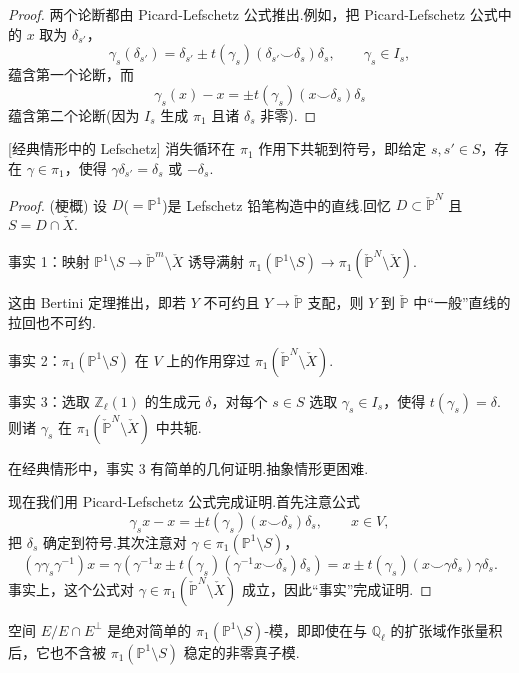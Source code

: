 \begin{proof}
两个论断都由 Picard-Lefschetz 公式推出.例如，把 Picard-Lefschetz 公式中的 $x$ 取为 $\delta_{s'}$，
\[
\gamma_s(\delta_{s'}) = \delta_{s'} \pm t(\gamma_s)(\delta_{s'} \smile \delta_s)\delta_s, \qquad \gamma_s \in I_s,
\]
蕴含第一个论断，而
\[
\gamma_s(x) - x = \pm t(\gamma_s)(x \smile \delta_s)\delta_s
\]
蕴含第二个论断(因为 $I_s$ 生成 $\pi_1$ 且诸 $\delta_s$ 非零).
\end{proof}

\begin{theorem}\label{thm:32.3}[经典情形中的 Lefschetz]
消失循环在 $\pi_1$ 作用下共轭到符号，即给定 $s, s' \in S$，存在 $\gamma \in \pi_1$，使得 $\gamma\delta_{s'} = \delta_s$ 或 $-\delta_s$.
\end{theorem}

\begin{proof}
(梗概) 设 $D$($= \mathbb{P}^{1}$)是 Lefschetz 铅笔构造中的直线.回忆 $D \subset \check{\mathbb{P}}^{N}$ 且 $S = D \cap \check{X}$.

事实 1：映射 $\mathbb{P}^{1} \setminus S \to \check{\mathbb{P}}^{m} \setminus \check{X}$ 诱导满射 $\pi_1(\mathbb{P}^{1} \setminus S) \to \pi_1(\check{\mathbb{P}}^{N} \setminus \check{X})$.

这由 Bertini 定理推出，即若 $Y$ 不可约且 $Y \to \check{\mathbb{P}}$ 支配，则 $Y$ 到 $\check{\mathbb{P}}$ 中``一般''直线的拉回也不可约.

事实 2：$\pi_1(\mathbb{P}^{1} \setminus S)$ 在 $V$ 上的作用穿过 $\pi_1(\check{\mathbb{P}}^{N} \setminus \check{X})$.

事实 3：选取 $\mathbb{Z}_{\ell}(1)$ 的生成元 $\delta$，对每个 $s \in S$ 选取 $\gamma_s \in I_s$，使得 $t(\gamma_s) = \delta$.则诸 $\gamma_s$ 在 $\pi_1(\check{\mathbb{P}}^{N} \setminus \check{X})$ 中共轭.

在经典情形中，事实 3 有简单的几何证明.抽象情形更困难.

现在我们用 Picard-Lefschetz 公式完成证明.首先注意公式
\[
\gamma_s x - x = \pm t(\gamma_s)(x \smile \delta_s)\delta_s, \qquad x \in V,
\]
把 $\delta_s$ 确定到符号.其次注意对 $\gamma \in \pi_1(\mathbb{P}^{1} \setminus S)$，
\[
(\gamma\gamma_s\gamma^{-1})x = \gamma(\gamma^{-1}x \pm t(\gamma_s)(\gamma^{-1}x \smile \delta_s)\delta_s) = x \pm t(\gamma_s)(x \smile \gamma\delta_s)\gamma\delta_s.
\]
事实上，这个公式对 $\gamma \in \pi_1(\check{\mathbb{P}}^{N} \setminus \check{X})$ 成立，因此``事实''完成证明.
\end{proof}

\begin{corollary}\label{cor:32.4}
空间 $E/E \cap E^{\perp}$ 是绝对简单的 $\pi_1(\mathbb{P}^{1} \setminus S)$-模，即即使在与 $\mathbb{Q}_{\ell}$ 的扩张域作张量积后，它也不含被 $\pi_1(\mathbb{P}^{1} \setminus S)$ 稳定的非零真子模.
\end{corollary}

